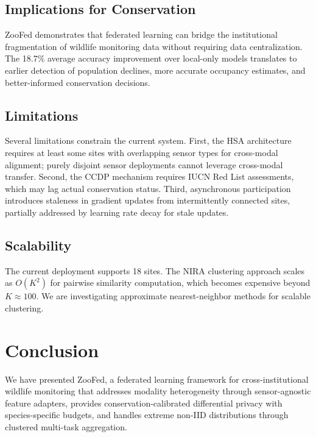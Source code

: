 \documentclass[11pt,a4paper]{article}
\begin{document}
\subsection{Implications for Conservation}

ZooFed demonstrates that federated learning can bridge the institutional fragmentation of wildlife monitoring data without requiring data centralization.
The 18.7\% average accuracy improvement over local-only models translates to earlier detection of population declines, more accurate occupancy estimates, and better-informed conservation decisions.

\subsection{Limitations}

Several limitations constrain the current system.
First, the HSA architecture requires at least some sites with overlapping sensor types for cross-modal alignment; purely disjoint sensor deployments cannot leverage cross-modal transfer.
Second, the CCDP mechanism requires IUCN Red List assessments, which may lag actual conservation status.
Third, asynchronous participation introduces staleness in gradient updates from intermittently connected sites, partially addressed by learning rate decay for stale updates.

\subsection{Scalability}

The current deployment supports 18 sites.
The NIRA clustering approach scales as $O(K^2)$ for pairwise similarity computation, which becomes expensive beyond $K \approx 100$.
We are investigating approximate nearest-neighbor methods for scalable clustering.

\section{Conclusion}
\label{sec:conclusion}

We have presented ZooFed, a federated learning framework for cross-institutional wildlife monitoring that addresses modality heterogeneity through sensor-agnostic feature adapters, provides conservation-calibrated differential privacy with species-specific budgets, and handles extreme non-IID distributions through clustered multi-task aggregation.
\end{document}
